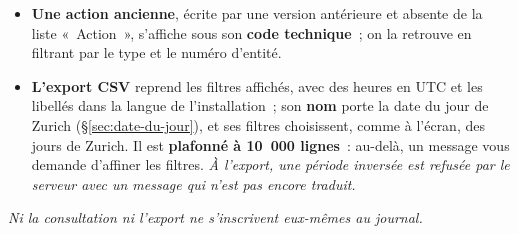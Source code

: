 \documentclass[a4paper,11pt,oneside]{article}
\begin{document}
\begin{itemize}
          fournisseur, par sa route ou par le dé-rapprochement --- porte la marque,
          contre-passation et délettrage compris~; une ligne écrite avant la
          0.17.7 --- avant la 0.17.8 pour l'annulation d'un règlement ou d'un solde --- ne
          porte pas la marque~; un appel du \textbf{serveur MCP}
          paraît, lui, \textbf{au nom du créateur de la clé du serveur MCP}, \textbf{sans} cette
          marque --- c'est l'action «~Outil du serveur MCP appelé~» et le numéro de la clé, au
          détail, qui le distinguent~; et la \textbf{consultation d'un rapport} par un agent
          (grand livre, balance, bilan, compte de résultat, balance âgée) paraît comme
          «~Rapport généré~», au nom du créateur de la clé~: à partir de la 0.17.5, son détail
          dit qu'elle vient du serveur MCP et de quelle clé --- \texttt{channel} et
          \texttt{mcp\_key\_id} ---, une ligne plus ancienne ne le disant pas), l'action et le type d'entité
          \textbf{traduits}, le numéro de la pièce --- «~---~» quand l'opération ne vise pas une pièce
          précise --- et un bouton qui déplie le \textbf{détail} enregistré.
    \item \textbf{Une action ancienne}, écrite par une version antérieure et absente de la liste
          «~Action~», s'affiche sous son \textbf{code technique}~; on la retrouve en filtrant par le
          type et le numéro d'entité.
    \item \textbf{L'export CSV} reprend les filtres affichés, avec des heures en UTC et les libellés
          dans la langue de l'installation~; son \textbf{nom} porte la date du jour de Zurich
          (\S\ref{sec:date-du-jour}), et ses filtres choisissent, comme à l'écran, des jours de
          Zurich. Il est \textbf{plafonné à 10~000 lignes}~: au-delà, un
          message vous demande d'affiner les filtres. \emph{À l'export, une période inversée est
          refusée par le serveur avec un message qui n'est pas encore traduit.}
\end{itemize}

\emph{Ni la consultation ni l'export ne s'inscrivent eux-mêmes au journal.}
\end{document}
